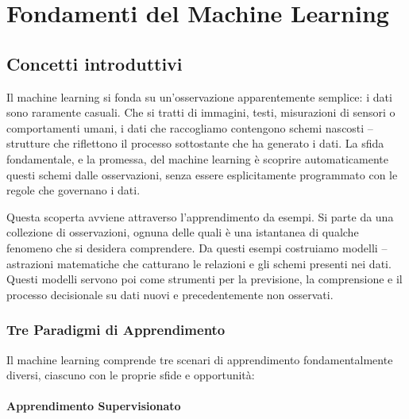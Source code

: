 %
%
%
%
%

\chapter{Fondamenti del Machine Learning}

\section*{Concetti introduttivi}
Il machine learning si fonda su un'osservazione apparentemente semplice: i dati sono raramente casuali. Che si tratti di immagini, testi, misurazioni di sensori o comportamenti umani, i dati che raccogliamo contengono schemi nascosti -- strutture che riflettono il processo sottostante che ha generato i dati. La sfida fondamentale, e la promessa, del machine learning è scoprire automaticamente questi schemi dalle osservazioni, senza essere esplicitamente programmato con le regole che governano i dati.

Questa scoperta avviene attraverso l'apprendimento da esempi. Si parte da una collezione di osservazioni, ognuna delle quali è una istantanea di qualche fenomeno che si desidera comprendere. Da questi esempi costruiamo \alert{modelli} -- astrazioni matematiche che catturano le relazioni e gli schemi presenti nei dati. Questi modelli servono poi come strumenti per la previsione, la comprensione e il processo decisionale su dati nuovi e precedentemente non osservati.


\subsection*{Tre Paradigmi di Apprendimento}

Il machine learning comprende tre scenari di apprendimento fondamentalmente diversi, ciascuno con le proprie sfide e opportunità:

\subsubsection*{Apprendimento Supervisionato}

